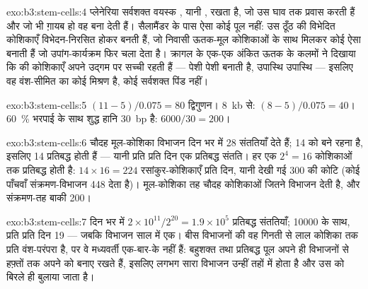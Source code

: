 \begin{solution}{exo:b3:stem-cells:4}
प्लेनेरिया सर्वशक्त वयस्क , यानी , रखता है, जो
उस घाव तक प्रवास करती हैं और जो भी ग़ायब हो वह बना देती हैं।
सैलामैंडर के पास ऐसा कोई पूल नहीं: उस ठूँठ की विभेदित कोशिकाएँ
विभेदन-निरसित होकर  बनती हैं, जो निवासी ऊतक-मूल कोशिकाओं के साथ
मिलकर कोई ऐसा  बनाती हैं जो उपांग-कार्यक्रम फिर चला देता है।
क्रागल के एक-एक अंकित ऊतक के कलमों ने दिखाया कि  की कोशिकाएँ
अपने उद्गम पर सच्ची रहती हैं --- पेशी पेशी बनाती है, उपास्थि उपास्थि
--- इसलिए वह  वंश-सीमित  का कोई मिश्रण है, कोई
सर्वशक्त पिंड नहीं।
\end{solution}

\begin{solution}{exo:b3:stem-cells:5}
$(11 - 5)/0.075 = 80$ द्विगुणन। \qty{8}{kb} से: $(8 - 5)/0.075 = 40$।
\qty{60}{\%} भरपाई के साथ शुद्ध हानि \qty{30}{bp} है: $6000/30
= 200$।
\end{solution}

\begin{solution}{exo:b3:stem-cells:6}
चौदह मूल-कोशिका विभाजन दिन भर में 28 संततियाँ देते हैं; 14 को  बने रहना है, इसलिए 14 प्रतिबद्ध होती हैं --- यानी प्रति  प्रति दिन एक प्रतिबद्ध संतति। हर एक $2^{4} = 16$ कोशिकाओं तक
प्रतिबद्ध होती है: $14\times 16 = 224$ रसांकुर-कोशिकाएँ प्रति दिन, यानी
देखी गई \num{300} की कोटि (कोई पाँचवाँ संक्रमण-विभाजन \num{448} देता
है)। मूल-कोशिका तह चौदह कोशिकाओं जितने विभाजन देती है, और संक्रमण-तह
बाकी \num{200}।
\end{solution}

\begin{solution}{exo:b3:stem-cells:7}
दिन भर में $2\times 10^{11}/2^{20} = 1.9\times 10^{5}$ प्रतिबद्ध
संततियाँ; \num{10000}  के साथ, प्रति  प्रति दिन
19 --- जबकि विभाजन साल में एक। बीस विभाजनों की वह गिनती  से
लाल कोशिका तक प्रति वंश-परंपरा है, पर वे मध्यवर्ती  एक-बार-के
नहीं हैं: बहुशक्त तथा प्रतिबद्ध  पूल अपने ही विभाजनों से
हफ़्तों तक अपने को बनाए रखते हैं, इसलिए लगभग सारा विभाजन उन्हीं
 तहों में होता है और उस  को बिरले ही बुलाया जाता है।
\end{solution}

